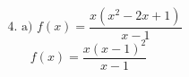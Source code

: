\documentclass{article}
\begin{document}
\[
4. \text{ a) } f(x) = \frac{x(x^2 - 2x + 1)}{x-1}
\]
\[
f(x) = \frac{x(x-1)^2}{x-1} \quad 
\]
\end{document}
